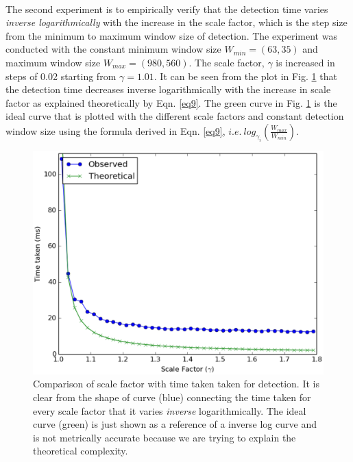 \paragraph{}
The second experiment is to empirically verify that the detection time varies \textit{inverse logarithmically} with the increase in the scale factor, which is the step size from the minimum to maximum window size of detection. The experiment was conducted with the constant minimum window size $W_{min}=(63, 35)$ and maximum window size $W_{max}=(980, 560)$. The scale factor, $\gamma$ is increased in steps of 0.02 starting from $\gamma = 1.01$. It can be seen from the plot in Fig. \ref{two} that the detection time decreases inverse logarithmically with the increase in scale factor as explained theoretically by Eqn. \ref{eq9}. The green curve in Fig. \ref{two} is the ideal curve that is plotted with the different scale factors and constant detection window size using the formula derived in Eqn. \ref{eq9}, $i.e. \ log_{\gamma_i}(\frac{W_{max}}{W_{min}})$.

\begin{figure}[h]
    \centering
    \includegraphics[width=\textwidth]{Appendices/figures1/gamma_vs_time}
    \caption{Comparison of scale factor with time taken taken for detection. It is clear from the shape of curve (blue) connecting the time taken for every scale factor that it varies \textit{inverse} logarithmically. The ideal curve (green) is just shown as a reference of a inverse log curve and is not metrically accurate because we are trying to explain the theoretical complexity.}
    \label{two}
\end{figure}
